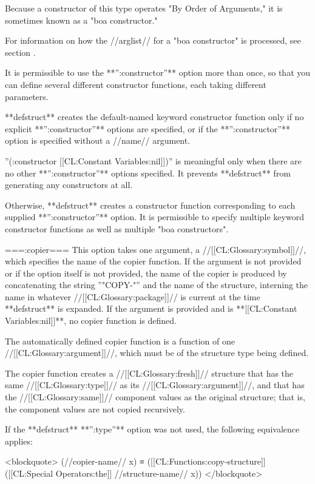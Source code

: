 Because a constructor of this type operates "By Order of Arguments," it is sometimes known as a "boa constructor."

For information on how the //arglist// for a "boa constructor" is processed, see section {\secref\BoaLambdaLists}.

It is permissible to use the **'':constructor''** option more than once, so that you can define several different constructor functions, each taking different parameters.

**defstruct** creates the default-named keyword constructor function only if no explicit **'':constructor''** options are specified, or if the **'':constructor''** option is specified without a //name// argument.

''(:constructor [[CL:Constant Variables:nil]])'' is meaningful only when there are no other **'':constructor''** options specified. It prevents **defstruct** from generating any constructors at all.

Otherwise, **defstruct** creates a constructor function corresponding to each supplied **'':constructor''** option. It is permissible to specify multiple keyword constructor functions as well as multiple "boa constructors".

===:copier===
This option takes one argument, a //[[CL:Glossary:symbol]]//, which specifies the name of the copier function. If the argument is not provided or if the option itself is not provided, the name of the copier is produced by concatenating the string ''"COPY-"'' and the name of the structure, interning the name in whatever //[[CL:Glossary:package]]// is current at the time **defstruct** is expanded. If the argument is provided and is **[[CL:Constant Variables:nil]]**, no copier function is defined.

The automatically defined copier function is a function of one //[[CL:Glossary:argument]]//, which must be of the structure type being defined.

The copier function creates a //[[CL:Glossary:fresh]]// structure that has the same //[[CL:Glossary:type]]// as its //[[CL:Glossary:argument]]//, and that has the //[[CL:Glossary:same]]// component values as the original structure; that is, the component values are not copied recursively.

If the **defstruct** **'':type''** option was not used, the following equivalence applies:

<blockquote> (//copier-name// x) ≡ ([[CL:Functions:copy-structure]] ([[CL:Special Operators:the]] //structure-name// x)) </blockquote>

